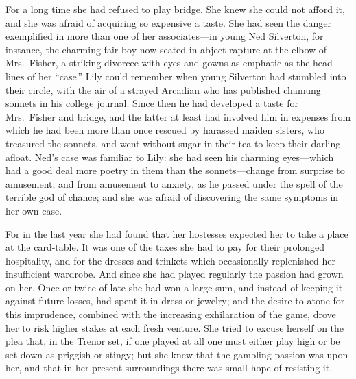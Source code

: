 \documentclass[12pt,a4paper]{book}
\begin{document}
For a long time she had refused to play bridge. She knew she
could not afford it, and she was afraid of acquiring so expensive
a taste. She had seen the danger exemplified in more than one of
her associates---in young Ned Silverton, for instance, the
charming fair boy now seated in abject rapture at the elbow of
Mrs.\ Fisher, a striking divorcee with eyes and gowns as emphatic
as the head-lines of her ``case.'' Lily could remember when young
Silverton had stumbled into their circle, with the air of a
strayed Arcadian who has published chamung sonnets in his college
journal. Since then he had developed a taste for Mrs.\ Fisher and
bridge, and the latter at least had involved him in expenses from
which he had been more than once rescued by harassed maiden
sisters, who treasured the sonnets, and went without sugar in
their tea to keep their darling afloat. Ned's case was
familiar to Lily: she had seen his charming eyes---which had a
good deal more poetry in them than the sonnets---change from
surprise to amusement, and from amusement to anxiety, as he
passed under the spell of the terrible god of chance; and she was
afraid of discovering the same symptoms in her own case.





For in the last year she had found that her hostesses expected
her to take a place at the card-table. It was one of the taxes
she had to pay for their prolonged hospitality, and for the
dresses and trinkets which occasionally replenished her
insufficient wardrobe. And since she had played regularly the
passion had grown on her. Once or twice of late she had won a
large sum, and instead of keeping it against future losses, had
spent it in dress or jewelry; and the desire to atone for this
imprudence, combined with the increasing exhilaration of the
game, drove her to risk higher stakes at each fresh venture. She
tried to excuse herself on the plea that, in the Trenor set, if
one played at all one must either play high or be set down as
priggish or stingy; but she knew that the gambling passion was
upon her, and that in her present surroundings there was small
hope of resisting it.
\end{document}
